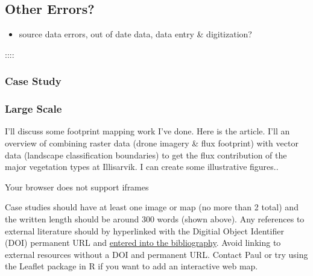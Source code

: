 \documentclass[
]{book}
\providecommand{\tightlist}{%
  \setlength{\itemsep}{0pt}\setlength{\parskip}{0pt}}
\begin{document}
\hypertarget{other-errors}{%
\subsection{Other Errors?}\label{other-errors}}

\begin{itemize}
\tightlist
\item
  source data errors, out of date data, data entry \& digitization?
\end{itemize}

::::

\hypertarget{case-study-2}{%
\subsubsection*{Case Study}\label{case-study-2}}

\hypertarget{box-text}{%
\subsubsection*{Large Scale}\label{box-text}}

I'll discuss some footprint mapping work I've done. Here is the article. I'll an overview of combining raster data (drone imagery \& flux footprint) with vector data (landscape classification boundaries) to get the flux contribution of the major vegetation types at Illisarvik. I can create some illustrative figures..

Your browser does not support iframes

Case studies should have at least one image or map (no more than 2 total) and the written length should be around 300 words (shown above). Any references to external literature should by hyperlinked with the Digitial Object Identifier (DOI) permanent URL and \href{https://bookdown.org/yihui/bookdown/citations.html}{entered into the bibliography}. Avoid linking to external resources without a DOI and permanent URL. Contact Paul or try using the Leaflet package in R if you want to add an interactive web map.

  
\end{document}
